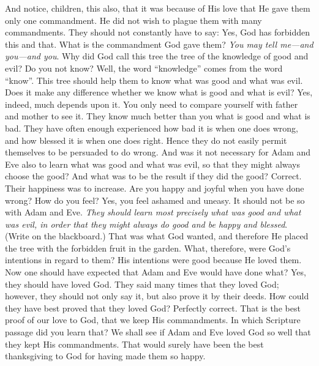 And notice, children, this also, that it was because of His love that He gave them only one commandment. He did not wish to plague them with many commandments. They should not constantly have to say: Yes, God has forbidden this and that. What is the commandment God gave them? \emph{You may tell me—and you—and you}. Why did God call this tree the tree of the knowledge of good and evil? Do you not know? Well, the word “knowledge” comes from the word “know”. This tree should help them to know what was good and what was evil. Does it make any difference whether we know what is good and what is evil? Yes, indeed, much depends upon it. You only need to compare yourself with father and mother to see it. They know much better than you what is good and what is bad. They have often enough experienced how bad it is when one does wrong, and how blessed it is when one does right. Hence they do not easily permit themselves to be persuaded to do wrong. And was it not necessary for Adam and Eve also to learn what was good and what was evil, so that they might always choose the good? And what was to be the result if they did the good? Correct. Their happiness was to increase. Are you happy and joyful when you have done wrong? How do you feel? Yes, you feel ashamed and uneasy. It should not be so with Adam and Eve. \emph{They should learn most precisely what was good and what was evil, in order that they might always do good and be happy and blessed}. (Write on the blackboard.) That was what God wanted, and therefore He placed the tree with the forbidden fruit in the garden. What, therefore, were God’s intentions in regard to them? His intentions were good because He loved them. Now one should have expected that Adam and Eve would have done what? Yes, they should have loved God. They said many times that they loved God; however, they should not only say it, but also prove it by their deeds. How could they have best proved that they loved God? Perfectly correct. That is the best proof of our love to God, that we keep His commandments. In which Scripture passage did you learn that? We shall see if Adam and Eve loved God so well that they kept His commandments. That would surely have been the best thanksgiving to God for having made them so happy.


